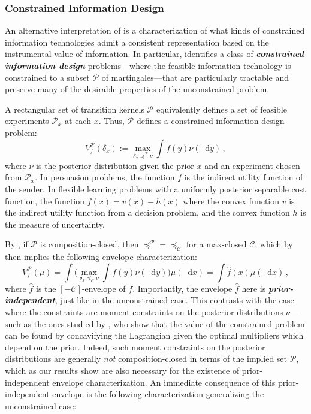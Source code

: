 \documentclass[12pt,letterpaper]{article}
\newenvironment{original}{\color{black}}{}
\theoremstyle{plain}
\theoremstyle{definition}
\theoremstyle{remark}
\newcommand{\Pc}{\mathcal{P}}
\renewcommand*\d{\mathop{}\!\mathrm{d}}
\theoremstyle{definition}
\begin{document}
\subsubsection{Constrained Information Design}
\begin{original}
An alternative interpretation of  is a characterization of what kinds of constrained information technologies admit a consistent representation based on the instrumental value of information. In particular,  identifies a class of \textbf{\textit{constrained information design}} problems---where the feasible information technology is constrained to a subset $\Pc$ of martingales---that are particularly tractable and preserve many of the desirable properties of the unconstrained problem.

A rectangular set of transition kernels $\Pc$ equivalently defines a set of feasible experiments $\mathcal{P}_x$ at each $x$. Thus, $\Pc$ defines a constrained information design problem:
\[V^{\mathcal{P}}_f(\delta_{x}) := \max_{\delta_{x} \preceq^{\mathcal{P}} \nu} \int f(y)  \nu(\d y)\,,\]
where $\nu$ is the posterior distribution given the prior $x$ and an experiment chosen from $\mathcal{P}_x$. In persuasion problems, the function $f$ is the indirect utility function of the sender. In flexible learning problems with a uniformly posterior separable cost function, the function $f(x) = v(x) - h(x)$ where the convex function $v$ is the indirect utility function from a decision problem, and the convex function $h$ is the measure of uncertainty.

By , if $\Pc$ is composition-closed, then $\preceq^{\mathcal{P}} = \preceq_{\mathcal{C}}$ for a max-closed $\mathcal{C}$, which by  then implies the following envelope characterization:
\[V^{\mathcal{P}}_f(\mu) = \int \Big( \max_{\delta_{x} \preceq_{\mathcal{C}} \nu} \int f(y)  \nu(\d y)\Big) \mu(\d x) = \int \widehat{f}(x)  \mu(\d x) \,,\]
where $\widehat{f}$ is the $[-\mathcal{C}]$-envelope of $f$. Importantly, the envelope $\widehat{f}$ here is \textit{\textbf{prior-independent}}, just like in the unconstrained case. This contrasts with the case where the constraints are moment constraints on the posterior distributions $\nu$---such as the ones studied by \citet{doval2024constrained}, who show that the value of the constrained problem can be found by concavifying the Lagrangian given the optimal multipliers which depend on the prior. Indeed, such moment constraints on the posterior distributions are generally \textit{not} composition-closed in terms of the implied set $\mathcal{P}$, which as our results show are also necessary for the existence of prior-independent envelope characterization. An immediate consequence of this prior-independent envelope is the following characterization generalizing the unconstrained case:
\end{original}
\end{document}
